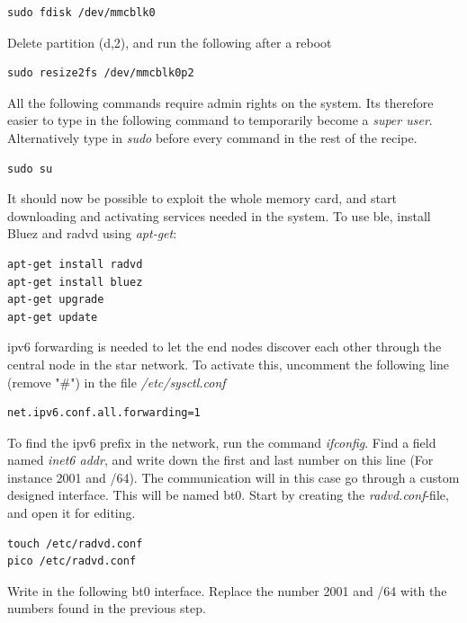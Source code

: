 \begin{verbatim}
sudo fdisk /dev/mmcblk0
\end{verbatim}

Delete partition (d,2), and run the following after a reboot

\begin{verbatim}
sudo resize2fs /dev/mmcblk0p2
\end{verbatim}

\noindent All the following commands require admin rights on the system. Its therefore easier to type in the following command to temporarily become a \textit{super user}. Alternatively type in \textit{sudo} before every command in the rest of the recipe.

\begin{verbatim}
sudo su
\end{verbatim} 

\noindent It should now be possible to exploit the whole memory card, and start downloading and activating services needed in the system. To use \gls{ble}, install Bluez and radvd using \textit{apt-get}:

\begin{verbatim}
apt-get install radvd
apt-get install bluez
apt-get upgrade
apt-get update
\end{verbatim}

\noindent \gls{ipv6} forwarding is needed to let the end nodes discover each other through the central node in the star network. To activate this, uncomment the following line (remove "\#") in the file \textit{/etc/sysctl.conf}

\begin{verbatim}
net.ipv6.conf.all.forwarding=1
\end{verbatim}

\noindent To find the \gls{ipv6} prefix in the network, run the command \textit{ifconfig}. Find a field named \textit{inet6 addr}, and write down the first and last number on this line (For instance 2001 and /64). 
The communication will in this case go through a custom designed interface. This will be named bt0. Start by creating the \textit{radvd.conf}-file, and open it for editing. 

\begin{verbatim}
touch /etc/radvd.conf
pico /etc/radvd.conf
\end{verbatim} 


\noindent Write in the following bt0 interface. Replace the number 2001 and /64 with the numbers found in the previous step. 

